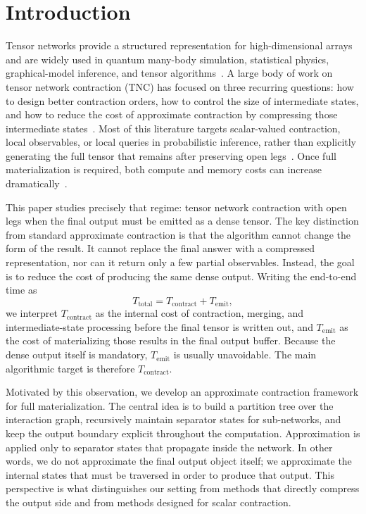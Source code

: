 \section{Introduction}

Tensor networks provide a structured representation for high-dimensional arrays and are widely used in quantum many-body simulation, statistical physics, graphical-model inference, and tensor algorithms~\cite{orus2014practical}. A large body of work on tensor network contraction (TNC) has focused on three recurring questions: how to design better contraction orders, how to control the size of intermediate states, and how to reduce the cost of approximate contraction by compressing those intermediate states~\cite{markov2008simulating,dumitrescu2018benchmarking,jakes2019carving,gray2021hyperoptimized,huang2021efficient,pan2020contracting,gray2024hyperoptimized,ma2024approximate}. Most of this literature targets scalar-valued contraction, local observables, or local queries in probabilistic inference, rather than explicitly generating the full tensor that remains after preserving open legs~\cite{orus2014practical,dechter1998bucket,pan2020contracting,heddes2026approximating}. Once full materialization is required, both compute and memory costs can increase dramatically~\cite{jakes2019carving}.

This paper studies precisely that regime: tensor network contraction with open legs when the final output must be emitted as a dense tensor. The key distinction from standard approximate contraction is that the algorithm cannot change the form of the result. It cannot replace the final answer with a compressed representation, nor can it return only a few partial observables. Instead, the goal is to reduce the cost of producing the same dense output. Writing the end-to-end time as
\[
T_{\mathrm{total}} = T_{\mathrm{contract}} + T_{\mathrm{emit}},
\]
we interpret $T_{\mathrm{contract}}$ as the internal cost of contraction, merging, and intermediate-state processing before the final tensor is written out, and $T_{\mathrm{emit}}$ as the cost of materializing those results in the final output buffer. Because the dense output itself is mandatory, $T_{\mathrm{emit}}$ is usually unavoidable. The main algorithmic target is therefore $T_{\mathrm{contract}}$.

Motivated by this observation, we develop an approximate contraction framework for full materialization. The central idea is to build a partition tree over the interaction graph, recursively maintain separator states for sub-networks, and keep the output boundary explicit throughout the computation. Approximation is applied only to separator states that propagate inside the network. In other words, we do not approximate the final output object itself; we approximate the internal states that must be traversed in order to produce that output. This perspective is what distinguishes our setting from methods that directly compress the output side and from methods designed for scalar contraction.


